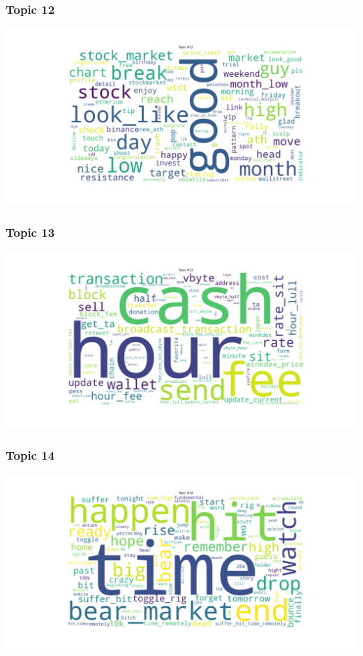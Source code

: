 \documentclass[
]{article}
\begin{document}
\hypertarget{topic-12}{%
\subsubsection{Topic 12}\label{topic-12}}

\includegraphics[width=7.8125in,height=\textheight]{images/03 - Topic_12.png}

\hypertarget{topic-13}{%
\subsubsection{Topic 13}\label{topic-13}}

\includegraphics[width=7.8125in,height=\textheight]{images/03 - Topic_13.png}

\hypertarget{topic-14}{%
\subsubsection{Topic 14}\label{topic-14}}

\includegraphics[width=7.8125in,height=\textheight]{images/03 - Topic_14.png}
\end{document}
